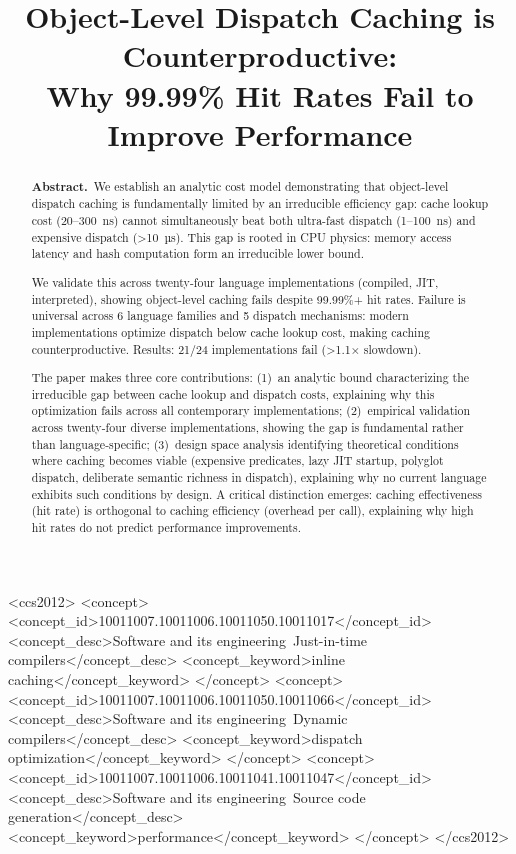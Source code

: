 \documentclass[sigplan,final,acmsmall,review,screen]{acmart}
\begin{document}
\title{Object-Level Dispatch Caching is Counterproductive: \\Why 99.99\% Hit Rates Fail to Improve Performance}


\begin{abstract}
\textbf{Abstract.}~We establish an analytic cost model demonstrating that object-level dispatch caching is fundamentally limited by an irreducible efficiency gap:
  cache lookup cost (20--300~ns) cannot simultaneously beat both ultra-fast dispatch (1--100~ns) and expensive dispatch (>10~µs). This gap is rooted in CPU physics: memory access latency and hash computation form an irreducible lower bound.

  We validate this across twenty-four language implementations (compiled, JIT, interpreted), showing object-level caching fails despite 99.99\%+ hit rates. Failure is universal across 6 language families and 5 dispatch mechanisms: modern implementations optimize dispatch below cache lookup cost, making caching counterproductive. Results: 21/24 implementations fail (>1.1× slowdown).

  The paper makes three core contributions: (1)~an analytic bound characterizing the irreducible gap between cache lookup and dispatch costs, explaining why
  this optimization fails across all contemporary implementations; (2)~empirical validation across twenty-four diverse implementations, showing the gap is
  fundamental rather than language-specific; (3)~design space analysis identifying theoretical conditions where caching becomes viable (expensive predicates,
  lazy JIT startup, polyglot dispatch, deliberate semantic richness in dispatch), explaining why no current language exhibits such conditions by design.
  A critical distinction emerges: caching effectiveness (hit rate) is orthogonal to caching efficiency (overhead per call), explaining why high hit rates
  do not predict performance improvements.
\end{abstract}

\begin{CCSXML}
<ccs2012>
<concept>
<concept_id>10011007.10011006.10011050.10011017</concept_id>
<concept_desc>Software and its engineering~Just-in-time compilers</concept_desc>
<concept_keyword>inline caching</concept_keyword>
</concept>
<concept>
<concept_id>10011007.10011006.10011050.10011066</concept_id>
<concept_desc>Software and its engineering~Dynamic compilers</concept_desc>
<concept_keyword>dispatch optimization</concept_keyword>
</concept>
<concept>
<concept_id>10011007.10011006.10011041.10011047</concept_id>
<concept_desc>Software and its engineering~Source code generation</concept_desc>
<concept_keyword>performance</concept_keyword>
</concept>
</ccs2012>
\end{CCSXML}
\end{document}
